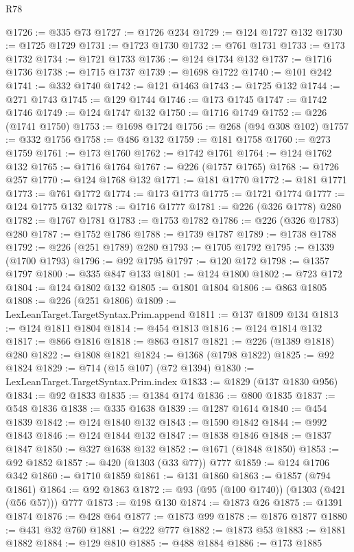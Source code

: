 \begin{lexlean}{R78}
\begin{coremodule}
@1726 := @335 @73
@1727 := @1726 @234
@1729 := @124 @1727 @132
@1730 := @1725 @1729
@1731 := @1723 @1730
@1732 := @761 @1731
@1733 := @173 @1732
@1734 := @1721 @1733
@1736 := @124 @1734 @132
@1737 := @1716 @1736
@1738 := @1715 @1737
@1739 := @1698 @1722
@1740 := @101 @242
@1741 := @332 @1740
@1742 := @121 @1463
@1743 := @1725 @132
@1744 := @271 @1743
@1745 := @129 @1744
@1746 := @173 @1745
@1747 := @1742 @1746
@1749 := @124 @1747 @132
@1750 := @1716 @1749
@1752 := @226 (@1741 @1750)
@1753 := @1698 @1724
@1756 := @268 (@94 @308 @102)
@1757 := @332 @1756
@1758 := @486 @132
@1759 := @181 @1758
@1760 := @273 @1759
@1761 := @173 @1760
@1762 := @1742 @1761
@1764 := @124 @1762 @132
@1765 := @1716 @1764
@1767 := @226 (@1757 @1765)
@1768 := @1726 @257
@1770 := @124 @1768 @132
@1771 := @181 @1770
@1772 := @181 @1771
@1773 := @761 @1772
@1774 := @173 @1773
@1775 := @1721 @1774
@1777 := @124 @1775 @132
@1778 := @1716 @1777
@1781 := @226 (@326 @1778) @280
@1782 := @1767 @1781
@1783 := @1753 @1782
@1786 := @226 (@326 @1783) @280
@1787 := @1752 @1786
@1788 := @1739 @1787
@1789 := @1738 @1788
@1792 := @226 (@251 @1789) @280
@1793 := @1705 @1792
@1795 := @1339 (@1700 @1793)
@1796 := @92 @1795
@1797 := @120 @172
@1798 := @1357 @1797
@1800 := @335 @847 @133
@1801 := @124 @1800
@1802 := @723 @172
@1804 := @124 @1802 @132
@1805 := @1801 @1804
@1806 := @863 @1805
@1808 := @226 (@251 @1806)
@1809 := LexLeanTarget.TargetSyntax.Prim.append
@1811 := @137 @1809 @134
@1813 := @124 @1811 @1804
@1814 := @454 @1813
@1816 := @124 @1814 @132
@1817 := @866 @1816
@1818 := @863 @1817
@1821 := @226 (@1389 @1818) @280
@1822 := @1808 @1821
@1824 := @1368 (@1798 @1822)
@1825 := @92 @1824
@1829 := @714 (@15 @107) (@72 @1394)
@1830 := LexLeanTarget.TargetSyntax.Prim.index
@1833 := @1829 (@137 @1830 @956)
@1834 := @92 @1833
@1835 := @1384 @174
@1836 := @800 @1835
@1837 := @548 @1836
@1838 := @335 @1638
@1839 := @1287 @1614
@1840 := @454 @1839
@1842 := @124 @1840 @132
@1843 := @1590 @1842
@1844 := @992 @1843
@1846 := @124 @1844 @132
@1847 := @1838 @1846
@1848 := @1837 @1847
@1850 := @327 @1638 @132
@1852 := @1671 (@1848 @1850)
@1853 := @92 @1852
@1857 := @420 (@1303 (@33 @77)) @777
@1859 := @124 @1706 @342
@1860 := @1710 @1859
@1861 := @131 @1860
@1863 := @1857 (@794 @1861)
@1864 := @92 @1863
@1872 := @93 (@95 (@100 @1740)) (@1303 (@421 (@56 @57))) @777
@1873 := @198 @130
@1874 := @1873 @26
@1875 := @1391 @1874
@1876 := @428 @64
@1877 := @1873 @99
@1878 := @1876 @1877
@1880 := @431 @32 @760
@1881 := @222 @777
@1882 := @1873 @53
@1883 := @1881 @1882
@1884 := @129 @810
@1885 := @488 @1884
@1886 := @173 @1885

\end{coremodule}
\end{lexlean}
